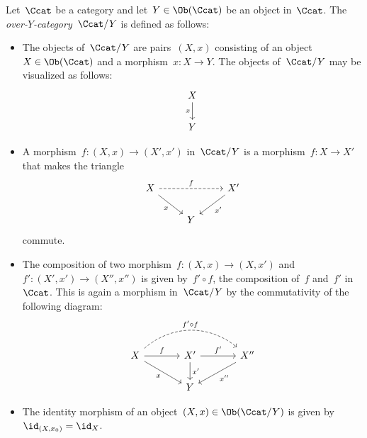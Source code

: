 \begin{remark*}
  Let~$\Ccat$ be a category and let~$Y \in \Ob(\Ccat)$ be an object in~$\Ccat$.
  The \emph{over\nobreakdash-$Y$\nobreakdash-category}~$\Ccat/Y$ is defined as follows:
  \begin{itemize}
    \item
      The objects of~$\Ccat/Y$ are pairs~$(X,x)$ consisting of an object~$X \in \Ob(\Ccat)$ and a morphism~$x \colon X \to Y$.
      The objects of~$\Ccat/Y$ may be visualized as follows:
      \[
        \begin{tikzcd}
            X
            \arrow{d}[left]{x}
          \\
            Y
        \end{tikzcd}
      \]
    \item
      A morphism~$f \colon (X,x) \to (X',x')$ in~$\Ccat/Y$ is a morphism~$f \colon X \to X'$ that makes the triangle
      \[
        \begin{tikzcd}
            X
            \arrow[dashed]{rr}[above]{f}
            \arrow{dr}[below left]{x}
          & {}
          & X'
            \arrow{dl}[below right]{x'}
          \\
            {}
          & Y
          & {}
        \end{tikzcd}
      \]
      commute.
    \item
      The composition of two morphism~$f \colon (X,x) \to (X,x')$ and~$f' \colon (X',x') \to (X'',x'')$ is given by~$f' \circ f$, the composition of~$f$ and~$f'$ in~$\Ccat$.
      This is again a morphism in~$\Ccat/Y$ by the commutativity of the following diagram:
      \[
        \begin{tikzcd}[column sep = large]
            X
            \arrow[dashed,bend left = 40]{rr}{f' \circ f}
            \arrow{r}[above]{f}
            \arrow{dr}[below left]{x}
          & X'
            \arrow{r}[above]{f'}
            \arrow{d}[right]{x'}
          & X''
            \arrow{dl}[below right]{x''}
          \\
            {}
          & Y
          & {}
        \end{tikzcd}
      \]
    \item
      The identity morphism of an object~$(X,x) \in \Ob(\Ccat/Y)$ is given by~$\id_{(X,x_0)} = \id_X$.
  \end{itemize}
  

\end{remark*}
